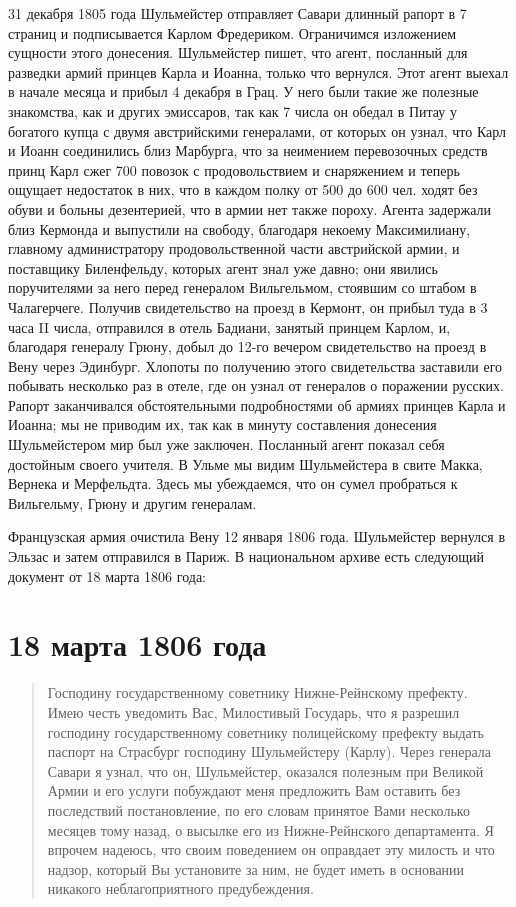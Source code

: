 \documentclass[
  oneside,
  12pt,
  titlepage]{book}
\begin{document}
31 декабря 1805 года Шульмейстер отправляет Савари длинный рапорт в 7 страниц и подписывается Карлом Фредериком. Ограничимся изложением сущности этого донесения. Шульмейстер пишет, что агент, посланный для разведки армий принцев Карла и Иоанна, только что вернулся. Этот агент выехал в начале месяца и прибыл 4 декабря в Грац. У него были такие же полезные знакомства, как и других эмиссаров, так как 7 числа он обедал в Питау у богатого купца с двумя австрийскими генералами, от которых он узнал, что Карл и Иоанн соединились близ Марбурга, что за неимением перевозочных средств принц Карл сжег 700 повозок с продовольствием и снаряжением и теперь ощущает недостаток в них, что в каждом полку от 500 до 600 чел. ходят без обуви и больны дезентерией, что в армии нет также пороху. Агента задержали близ Кермонда и выпустили на свободу, благодаря некоему Максимилиану, главному администратору продовольственной части австрийской армии, и поставщику Биленфельду, которых агент знал уже давно; они явились поручителями за него перед генералом Вильгельмом, стоявшим со штабом в Чалагерчеге. Получив свидетельство на проезд в Кермонт, он прибыл туда в 3 часа II числа, отправился в отель Бадиани, занятый принцем Карлом, и, благодаря генералу Грюну, добыл до 12-го вечером свидетельство на проезд в Вену через Эдинбург. Хлопоты по получению этого свидетельства заставили его побывать несколько раз в отеле, где он узнал от генералов о поражении русских. Рапорт заканчивался обстоятельными подробностями об армиях принцев Карла и Иоанна; мы не приводим их, так как в минуту составления донесения Шульмейстером мир был уже заключен. Посланный агент показал себя достойным своего учителя. В Ульме мы видим Шульмейстера в свите Макка, Вернека и Мерфельдта. Здесь мы убеждаемся, что он сумел пробраться к Вильгельму, Грюну и другим генералам.

Французская армия очистила Вену 12 января 1806 года. Шульмейстер вернулся в Эльзас и затем отправился в Париж. В национальном архиве есть следующий документ от 18 марта 1806 года:

\hypertarget{ux43cux430ux440ux442ux430-1806-ux433ux43eux434ux430}{%
\section{18 марта 1806 года}\label{ux43cux430ux440ux442ux430-1806-ux433ux43eux434ux430}}

\begin{quote}
Господину государственному советнику Нижне-Рейнскому префекту.\\
Имею честь уведомить Вас, Милостивый Государь, что я разрешил господину государственному советнику полицейскому префекту выдать паспорт на Страсбург господину Шульмейстеру (Карлу). Через генерала Савари я узнал, что он, Шульмейстер, оказался полезным при Великой Армии и его услуги побуждают меня предложить Вам оставить без последствий постановление, по его словам принятое Вами несколько месяцев тому назад, о высылке его из Нижне-Рейнского департамента. Я впрочем надеюсь, что своим поведением он оправдает эту милость и что надзор, который Вы установите за ним, не будет иметь в основании никакого неблагоприятного предубеждения.
\end{quote}
\end{document}
